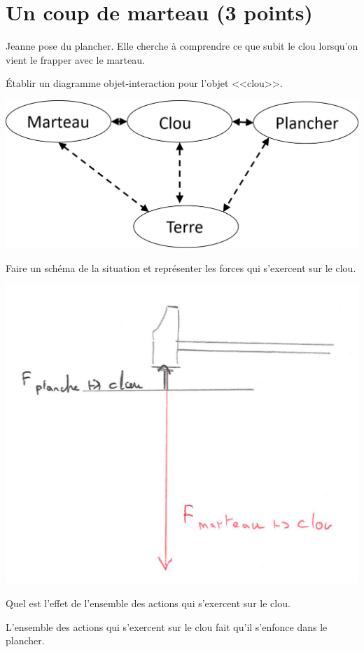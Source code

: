 \section{Un coup de marteau (3 points)}\label{marteau}

Jeanne pose du plancher. Elle cherche à comprendre ce que subit le clou lorsqu'on vient le frapper avec le marteau.

\begin{questions}
	\question \'Etablir un diagramme objet-interaction pour l'objet <<clou>>.
		\begin{solution}
			\begin{center}
				\includegraphics[scale=0.5]{doi_marteau}
			\end{center}
		\end{solution}
	\question Faire un schéma de la situation et représenter les forces qui s'exercent sur le clou.
		\begin{solution}
			\begin{center}
				\includegraphics[scale=0.35]{forces_clou}
			\end{center}
		\end{solution}
	\question Quel est l'effet de l'ensemble des actions qui s'exercent sur le clou.
		\begin{solution}
			L'ensemble des actions qui s'exercent sur le clou fait qu'il s'enfonce dans le plancher.
		\end{solution}
	
\end{questions}

